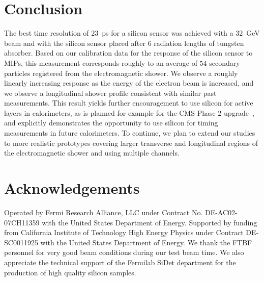 \documentclass[preprint,1p]{elsarticle}
\begin{document}
\section{Conclusion}
\label{sec:conclusion} 

The best time resolution of $23$~ps for a silicon sensor was achieved with a $32$~GeV beam 
and with the silicon sensor placed after 6 radiation
lengths of tungsten absorber. Based on our calibration data for the response of the
silicon sensor to MIPs, this measurement corresponds roughly to 
an average of $54$ secondary particles registered from the electromagnetic shower. 
We observe a roughly linearly increasing response as the energy of the electron beam
is increased, and we observe a longitudinal shower profile consistent with similar 
past measurements. This result yields further encouragement to use silicon for 
active layers in calorimeters, as is planned for example for the CMS Phase 2 
upgrade~\cite{Butler:2020886}, and explicitly demonstrates the opportunity 
to use silicon for timing measurements in future calorimeters. To continue, we plan to 
extend our studies to more realistic prototypes covering larger transverse and longitudinal 
regions of the electromagnetic shower and using multiple channels. 


\section{Acknowledgements} Operated by Fermi Research Alliance, LLC under
Contract No. DE-AC02-07CH11359 with the United States Department of Energy.
Supported by funding from California Institute of Technology High Energy Physics
under Contract DE-SC0011925 with the United States Department of Energy. We
thank the FTBF personnel for very good beam conditions during our test beam
time. We also appreciate the technical support of the Fermilab SiDet department
for the production of high quality silicon samples. 





{}
 




\end{document}

